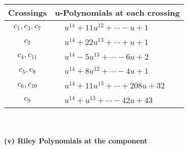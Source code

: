 \documentclass[1p]{elsarticle_modified}
\theoremstyle{definition}
\begin{document}
\begin{tabular}{m{50pt}|m{274pt}}
Crossings & \hspace{64pt}u-Polynomials at each crossing \\
\hline $$\begin{aligned}c_{1},c_{3},c_{7}\end{aligned}$$&$\begin{aligned}
&u^{14}+11 u^{12}+\cdots- u+1
\end{aligned}$\\
\hline $$\begin{aligned}c_{2}\end{aligned}$$&$\begin{aligned}
&u^{14}+22 u^{13}+\cdots+u+1
\end{aligned}$\\
\hline $$\begin{aligned}c_{4},c_{11}\end{aligned}$$&$\begin{aligned}
&u^{14}-5 u^{13}+\cdots-6 u+2
\end{aligned}$\\
\hline $$\begin{aligned}c_{5},c_{8}\end{aligned}$$&$\begin{aligned}
&u^{14}+8 u^{12}+\cdots-4 u+1
\end{aligned}$\\
\hline $$\begin{aligned}c_{6},c_{10}\end{aligned}$$&$\begin{aligned}
&u^{14}+11 u^{13}+\cdots+208 u+32
\end{aligned}$\\
\hline $$\begin{aligned}c_{9}\end{aligned}$$&$\begin{aligned}
&u^{14}+u^{13}+\cdots-42 u+43
\end{aligned}$\\
\hline
\end{tabular}\\~\\
\newpage\renewcommand{\arraystretch}{1}
\flushleft \textbf{(v) Riley Polynomials at the component}\newline \\
\end{document}

